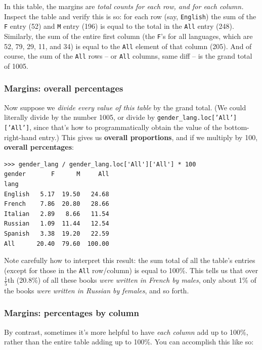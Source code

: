 In this table, the margins are \textit{total counts for each row, and for each
column.} Inspect the table and verify this is so: for each row (say,
\texttt{English}) the sum of the \texttt{F} entry (52) and \texttt{M} entry
(196) is equal to the total in the \texttt{All} entry (248). Similarly, the sum
of the entire first column (the \texttt{F}'s for all languages, which are 52,
79, 29, 11, and 34) is equal to the \texttt{All} element of that column (205).
And of course, the sum of the \texttt{All} rows -- or \texttt{All} columns,
same diff -- is the grand total of 1005.

\subsubsection{Margins: overall percentages}

Now suppose we \textit{divide every value of this table} by the grand total.
(We could literally divide by the number 1005, or divide by
\texttt{gender\_lang.loc['All']['All']}, since that's how to programmatically
obtain the value of the bottom-right-hand entry.) This gives us \textbf{overall
proportions}, and if we multiply by 100, \textbf{overall percentages}:

\begin{Verbatim}[fontsize=\scriptsize,samepage=true,frame=single]
>>> gender_lang / gender_lang.loc['All']['All'] * 100
gender       F      M     All
lang                         
English   5.17  19.50   24.68
French    7.86  20.80   28.66
Italian   2.89   8.66   11.54
Russian   1.09  11.44   12.54
Spanish   3.38  19.20   22.59
All      20.40  79.60  100.00
\end{Verbatim}

Note carefully how to interpret this result: the sum total of all the table's
entries (except for those in the \texttt{All} row/column) is equal to 100\%.
This tells us that over $\frac{1}{5}$th (20.8\%) of all these books
\textit{were written in French by males}, only about 1\% of the books
\textit{were written in Russian by females}, and so forth.

\subsubsection{Margins: percentages by column}

By contrast, sometimes it's more helpful to have \textit{each column} add up to
100\%, rather than the entire table adding up to 100\%. You can accomplish this
like so:

